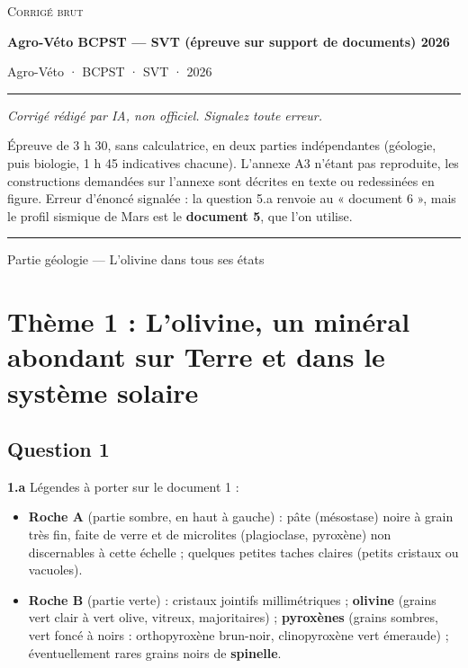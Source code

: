 \documentclass[11pt,a4paper]{article}
\providecommand{\tightlist}{\setlength{\itemsep}{0pt}\setlength{\parskip}{0pt}}
\begin{document}
\thispagestyle{plain}
\begin{center}
  {\small\scshape Corrigé brut}\par\smallskip
  {\LARGE\bfseries Agro-Véto BCPST — SVT (épreuve sur support de documents) 2026\par}\medskip
  {\large Agro-Véto · BCPST · SVT · 2026\par}
\end{center}
\vspace{2pt}\hrule\vspace{8pt}

\emph{Corrigé rédigé par IA, non officiel. Signalez toute erreur.}

Épreuve de 3 h 30, sans calculatrice, en deux parties indépendantes (géologie, puis biologie, 1 h 45 indicatives chacune). L'annexe A3 n'étant pas reproduite, les constructions demandées sur l'annexe sont décrites en texte ou redessinées en figure. Erreur d'énoncé signalée : la question 5.a renvoie au « document 6 », mais le profil sismique de Mars est le \textbf{document 5}, que l'on utilise.

\begin{center}\rule{0.5\linewidth}{0.5pt}\end{center}

Partie géologie --- L'olivine dans tous ses états

\hypertarget{thuxe8me-1-lolivine-un-minuxe9ral-abondant-sur-terre-et-dans-le-systuxe8me-solaire}{%
\section{Thème 1 : L'olivine, un minéral abondant sur Terre et dans le système solaire}\label{thuxe8me-1-lolivine-un-minuxe9ral-abondant-sur-terre-et-dans-le-systuxe8me-solaire}}

\hypertarget{question-1}{%
\subsection{Question 1}\label{question-1}}

\textbf{1.a} Légendes à porter sur le document 1 :

\begin{itemize}
\tightlist
\item
  \textbf{Roche A} (partie sombre, en haut à gauche) : pâte (mésostase) noire à grain très fin, faite de verre et de microlites (plagioclase, pyroxène) non discernables à cette échelle ; quelques petites taches claires (petits cristaux ou vacuoles).
\item
  \textbf{Roche B} (partie verte) : cristaux jointifs millimétriques ; \textbf{olivine} (grains vert clair à vert olive, vitreux, majoritaires) ; \textbf{pyroxènes} (grains sombres, vert foncé à noirs : orthopyroxène brun-noir, clinopyroxène vert émeraude) ; éventuellement rares grains noirs de \textbf{spinelle}.
\end{itemize}
\end{document}
